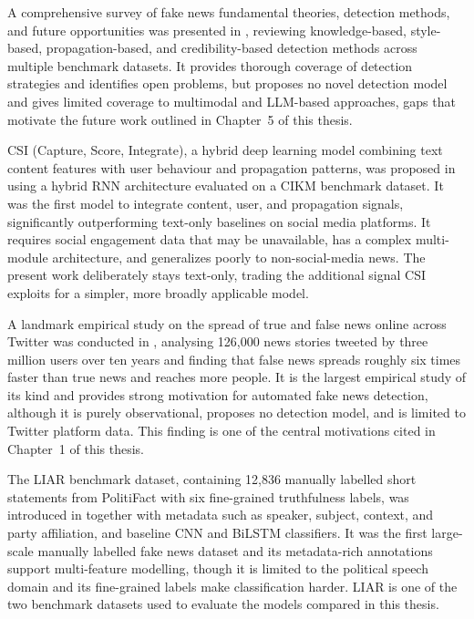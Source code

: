 A comprehensive survey of fake news fundamental theories, detection methods, and future opportunities was presented in \citep{Zhou2020Survey}, reviewing knowledge-based, style-based, propagation-based, and credibility-based detection methods across multiple benchmark datasets. It provides thorough coverage of detection strategies and identifies open problems, but proposes no novel detection model and gives limited coverage to multimodal and LLM-based approaches, gaps that motivate the future work outlined in Chapter~5 of this thesis.

CSI (Capture, Score, Integrate), a hybrid deep learning model combining text content features with user behaviour and propagation patterns, was proposed in \citep{Ruchansky2017CSI} using a hybrid RNN architecture evaluated on a CIKM benchmark dataset. It was the first model to integrate content, user, and propagation signals, significantly outperforming text-only baselines on social media platforms. It requires social engagement data that may be unavailable, has a complex multi-module architecture, and generalizes poorly to non-social-media news. The present work deliberately stays text-only, trading the additional signal CSI exploits for a simpler, more broadly applicable model.

A landmark empirical study on the spread of true and false news online across Twitter was conducted in \citep{Vosoughi2018Spread}, analysing 126,000 news stories tweeted by three million users over ten years and finding that false news spreads roughly six times faster than true news and reaches more people. It is the largest empirical study of its kind and provides strong motivation for automated fake news detection, although it is purely observational, proposes no detection model, and is limited to Twitter platform data. This finding is one of the central motivations cited in Chapter~1 of this thesis.

The LIAR benchmark dataset, containing 12,836 manually labelled short statements from PolitiFact with six fine-grained truthfulness labels, was introduced in \citep{Wang2017Liar} together with metadata such as speaker, subject, context, and party affiliation, and baseline CNN and BiLSTM classifiers. It was the first large-scale manually labelled fake news dataset and its metadata-rich annotations support multi-feature modelling, though it is limited to the political speech domain and its fine-grained labels make classification harder. LIAR is one of the two benchmark datasets used to evaluate the models compared in this thesis.

